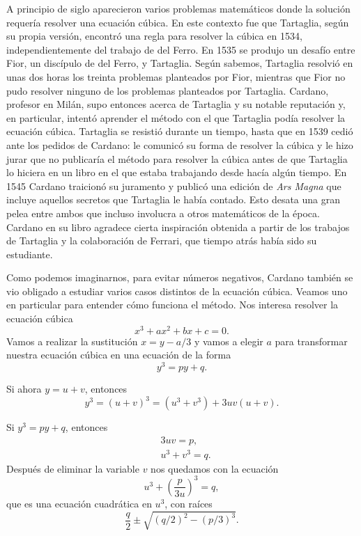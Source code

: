 A principio de siglo aparecieron varios problemas matemáticos donde la solución
requería resolver una ecuación cúbica. En este contexto fue que Tartaglia,
según su propia versión, encontró una regla para resolver la cúbica en 1534,
independientemente del trabajo de del Ferro. En 1535 se produjo un desafío
entre Fior, un discípulo de del Ferro, y Tartaglia.  Según sabemos, Tartaglia
resolvió en unas dos horas los treinta problemas planteados por Fior, mientras
que Fior no pudo resolver ninguno de los problemas planteados por Tartaglia.
Cardano, profesor en Milán, supo entonces acerca de Tartaglia y su notable
reputación y, en particular, intentó aprender el método con el que Tartaglia
podía resolver la ecuación cúbica. Tartaglia se resistió durante un tiempo,
hasta que en 1539 cedió ante los pedidos de Cardano: le comunicó su forma de
resolver la cúbica y le hizo jurar que no publicaría el método para resolver la
cúbica antes de que Tartaglia lo hiciera en un libro en el que estaba
trabajando desde hacía algún tiempo. En 1545 Cardano traicionó su juramento y
publicó una edición de \emph{Ars Magna} que incluye aquellos secretos que
Tartaglia le había contado.  Esto desata una gran pelea entre ambos que incluso
involucra a otros matemáticos de la época. Cardano en su libro  
agradece cierta inspiración obtenida a partir de los trabajos de Tartaglia y la
colaboración de Ferrari, que tiempo atrás había sido su estudiante. 

Como podemos imaginarnos, para evitar números negativos, Cardano también se vio
obligado a estudiar varios casos distintos de la ecuación cúbica. Veamos uno en
particular para entender cómo funciona el método. Nos interesa resolver la
ecuación cúbica
\[
x^3+ax^2+bx+c=0.
\]
Vamos a realizar la sustitución $x=y-a/3$ y vamos a elegir $a$ para transformar
nuestra ecuación cúbica en una ecuación de la forma
\[
	y^3=py+q.
\]

Si ahora $y=u+v$, entonces
\[
	y^3=(u+v)^3=(u^3+v^3)+3uv(u+v).
\]

Si $y^3=py+q$, entonces 
\begin{align*}
	&3uv = p,\\
	&u^3+v^3=q.
\end{align*}
Después de eliminar la variable $v$ nos quedamos con la ecuación
\[
	u^3+\left(\frac{p}{3u}\right)^3=q,
\]
que es una ecuación cuadrática en $u^3$, con raíces
\[
	\frac{q}{2}\pm\sqrt{(q/2)^2-(p/3)^3}.
\]


